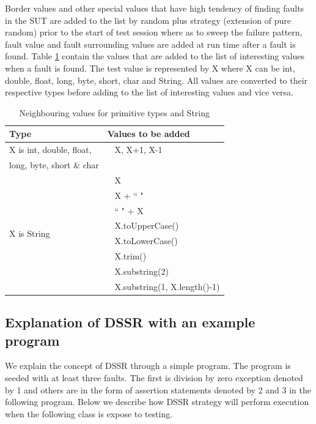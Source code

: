 \documentclass[conference]{IEEEtran}
\begin{document}
Border values and other special values that have high tendency of finding faults in the SUT are added to the list by random plus strategy (extension of pure random) prior to the start of test session where as to sweep the failure pattern, fault value and fault surrounding values are added at run time after a fault is found. Table \ref{table:addvalues} contain the values that are added to the list of interesting values when a fault is found. The test value is represented by X where X can be int, double, float, long, byte, short, char and String. All values are converted to their respective types before adding to the list of interesting values and vice versa.

\begin{table}[ht]
\centering %
\begin{tabular}{| l | l |} %
\hline\hline %
Type & Values to be added\\ [0.5ex] %
\hline %
\multirow{1}{*}{X is int, double, float, } & ~ X,  X+1, X-1 \\ %
\multirow{1}{*}{long, byte, short \& char} &  \\ 

\hline
\multirow{8}{*}{X is String} & ~ X\\ %

& ~ X + ``  "\\ %
& ~ ``  " + X \\ %
& ~ X.toUpperCase() \\
& ~ X.toLowerCase() \\
& ~ X.trim() \\
& ~ X.substring(2) \\
& ~ X.substring(1, X.length()-1) \\[1ex]
\hline
\hline %
\end{tabular}
\label{table:addvalues} \caption{Neighbouring values for primitive types and String} %
\end{table}
\subsection{Explanation of DSSR with an example program}
We explain the concept of DSSR through a simple program. The program is seeded with at least three faults. The first is division by zero exception denoted by 1 and others are in the form of assertion statements denoted by 2 and 3 in the following program.  Below we describe how DSSR strategy will perform execution when the following class is expose to testing.\\
\end{document}
